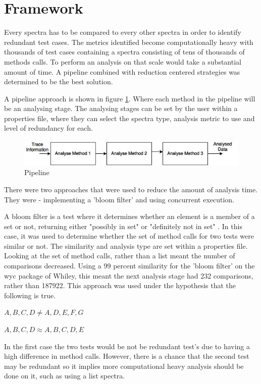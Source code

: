 \section{Framework}
\label{S:framework}

Every spectra has to be compared to every other spectra in order to identify redundant test cases. The metrics identified become computationally heavy with thousands of test cases containing a spectra consisting of tens of thousands of methods calls. To perform an analysis on that scale would take a substantial amount of time. A pipeline combined with reduction centered strategies was determined to be the best solution.

A pipeline approach is shown in figure \ref{fig:pipeline}. Where each method in the pipeline will be an analysing stage. The analysing stages can be set by the user within a properties file, where they can select the spectra type, analysis metric to use and level of redundancy for each.

\begin{figure}[h]
\includegraphics[width=\textwidth]{Pipeline.jpg}
\caption{Pipeline}
\label{fig:pipeline}
\end{figure}

There were two approaches that were used to reduce the amount of analysis time. They were - implementing a 'bloom filter' and using concurrent execution. 

A bloom filter is a test where it determines whether an element is a member of a set or not, returning either "possibly in set" or "definitely not in set" \cite{bloomfilterwiki}. In this case, it was used to determine whether the set of method calls for two tests were similar or not. The similarity and analysis type are set within a properties file. Looking at the set of method calls, rather than a list meant the number of comparisons decreased. Using a 99 percent similarity for the 'bloom filter' on the wyc package of Whiley, this meant the next analysis stage had 232 comparisons, rather than 187922. This approach was used under the hypothesis that the following is true.

$A, B, C, D \neq A, D, E, F, G$

$A, B, C, D \approx A, B, C, D, E$

In the first case the two tests would be not be redundant test’s due to having a high difference in method calls. However, there is a chance that the second test may be redundant so it implies more computational heavy analysis should be done on it, such as using a list spectra. 

